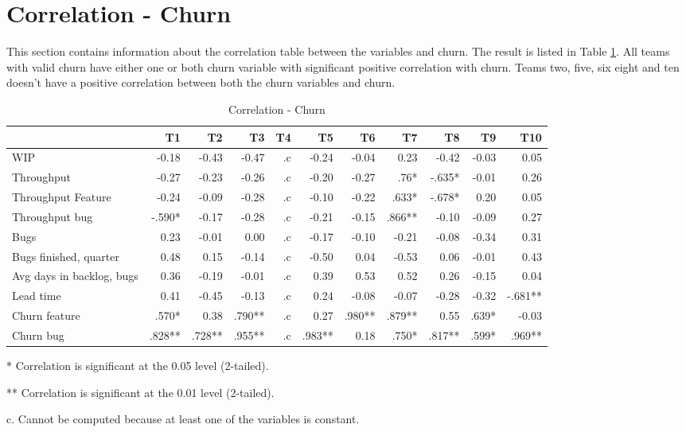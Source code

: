 \documentclass[UKenglish]{ifimaster}  %
\begin{document}
\section{Correlation - Churn}
\label{sec:corr:churn}
This section contains information about the correlation table between the variables and churn. The result is listed in Table \ref{corr:churn}.  All teams with valid churn have either one or both churn variable with significant positive correlation with churn. Teams two, five, six eight and ten doesn't have a positive correlation between both the churn variables and churn.  

\begin{table}[!htbp]
 \begin{adjustwidth}{-1.5cm}{}
 \centering
 \begin{tabular}{|l|r|r|r|r|r|r|r|r|r|r|}
\hline
 & \bf{T1} & \bf{T2} & \bf{T3} & \bf{T4} & \bf{T5} & \bf{T6} & \bf{T7} & \bf{T8} & \bf{T9} & \bf{T10}\\ \hline
WIP &-0.18& -0.43& -0.47& .c& -0.24& -0.04& 0.23& -0.42& -0.03& 0.05\\ \hline
Throughput &-0.27& -0.23& -0.26& .c& -0.20& -0.27& .76*& -.635*& -0.01& 0.26\\ \hline
Throughput Feature &-0.24& -0.09& -0.28& .c& -0.10& -0.22& .633*& -.678*& 0.20& 0.05\\ \hline
Throughput bug &-.590*& -0.17& -0.28& .c& -0.21& -0.15& .866**& -0.10& -0.09& 0.27\\ \hline
Bugs &0.23& -0.01& 0.00& .c& -0.17& -0.10& -0.21& -0.08& -0.34& 0.31\\ \hline
Bugs finished, quarter &0.48& 0.15& -0.14& .c& -0.50& 0.04& -0.53& 0.06& -0.01& 0.43\\ \hline
Avg days in backlog, bugs &0.36& -0.19& -0.01& .c& 0.39& 0.53& 0.52& 0.26& -0.15& 0.04\\ \hline
Lead time &0.41& -0.45& -0.13& .c& 0.24& -0.08& -0.07& -0.28& -0.32& -.681**\\ \hline
Churn feature &.570*& 0.38& .790**& .c& 0.27& .980**& .879**& 0.55& .639*& -0.03\\ \hline
Churn bug &.828**& .728**& .955**& .c& .983**& 0.18& .750*& .817**& .599*& .969**\\ \hline
\end{tabular}
 \caption{Correlation - Churn}
 \label{corr:churn}
 \centerline {* Correlation is significant at the 0.05 level (2-tailed).}
\centerline{** Correlation is significant at the 0.01 level (2-tailed).}
\centerline{c. Cannot be computed because at least one of the variables is constant.}
\end{adjustwidth}
\end{table}
\end{document}

